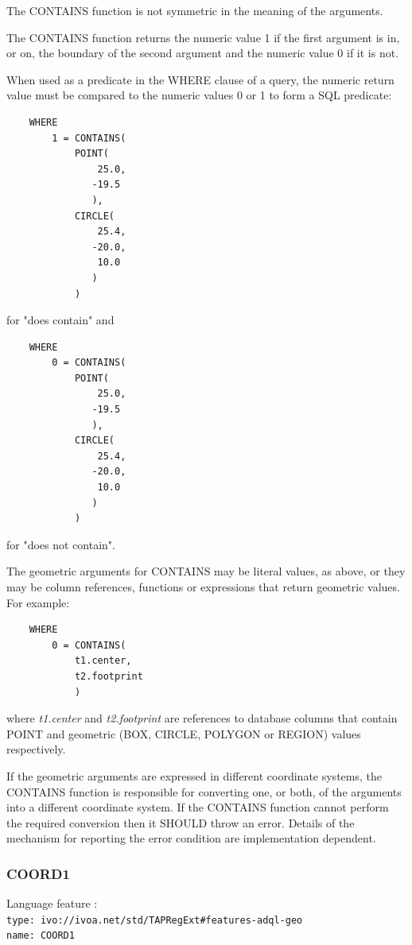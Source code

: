 \documentclass[11pt,a4paper]{ivoa}
\begin{document}
The CONTAINS function is not symmetric in the meaning of the arguments.

The CONTAINS function returns the numeric value 1 if the first argument
is in, or on, the boundary of the second argument and the numeric value 0
if it is not.

When used as a predicate in the WHERE clause of a query, the numeric return
value must be compared to the numeric values 0 or 1 to form a SQL predicate:
\begin{verbatim}
    WHERE
        1 = CONTAINS(
            POINT(
                25.0,
               -19.5
               ),
            CIRCLE(
                25.4,
               -20.0,
                10.0
               )
            )
\end{verbatim}
\noindent
for "does contain" and
\begin{verbatim}
    WHERE
        0 = CONTAINS(
            POINT(
                25.0,
               -19.5
               ),
            CIRCLE(
                25.4,
               -20.0,
                10.0
               )
            )
\end{verbatim}
\noindent
for "does not contain".


The geometric arguments for CONTAINS may be literal values, as above,
or they may be column references, functions or expressions that return
geometric values.
For example:
\begin{verbatim}
    WHERE
        0 = CONTAINS(
            t1.center,
            t2.footprint
            )
\end{verbatim}
where \textit{t1.center} and \textit{t2.footprint} are references to
database columns that contain POINT and geometric (BOX, CIRCLE, POLYGON or REGION)
values respectively.

If the geometric arguments are expressed in different coordinate systems,
the CONTAINS function is responsible for converting one, or both, of the
arguments into a different coordinate system.
If the CONTAINS function cannot perform the required conversion then
it SHOULD throw an error.
Details of the mechanism for reporting the error condition are
implementation dependent.

\subsubsection{COORD1}
\label{sec:functions.geom.coord1}
{\footnotesize Language feature :}\\
{\footnotesize \verb|type: ivo://ivoa.net/std/TAPRegExt#features-adql-geo|}\\
{\footnotesize \verb|name: COORD1|}\\
\end{document}
